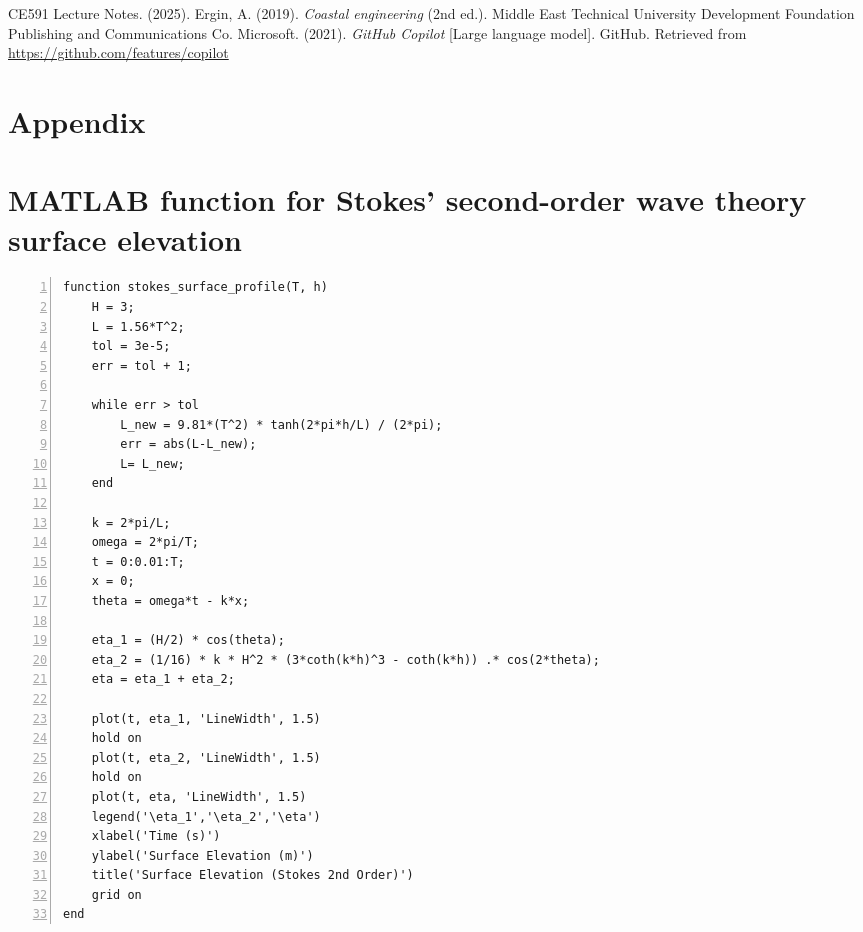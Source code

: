 \documentclass[a4paper]{article}
\begin{document}
\newpage

\begin{thebibliography}{99}
     CE591 Lecture Notes. (2025). 
     Ergin, A. (2019). \textit{Coastal engineering} (2nd ed.). Middle East Technical University Development Foundation Publishing and Communications Co.
     Microsoft. (2021). \textit{GitHub Copilot} [Large language model]. GitHub. Retrieved from \url{https://github.com/features/copilot}
\end{thebibliography}

\newpage
\appendix

\section{Appendix}

\section*{\small MATLAB function for Stokes' second-order wave theory surface elevation}
\begin{lstlisting}[frame=single, numbers=left, style=Matlab-Pyglike]
function stokes_surface_profile(T, h)
    H = 3;
    L = 1.56*T^2; 
    tol = 3e-5;
    err = tol + 1;

    while err > tol
        L_new = 9.81*(T^2) * tanh(2*pi*h/L) / (2*pi);
        err = abs(L-L_new);
        L= L_new;
    end

    k = 2*pi/L;
    omega = 2*pi/T;
    t = 0:0.01:T;
    x = 0;
    theta = omega*t - k*x;

    eta_1 = (H/2) * cos(theta);
    eta_2 = (1/16) * k * H^2 * (3*coth(k*h)^3 - coth(k*h)) .* cos(2*theta);
    eta = eta_1 + eta_2;

    plot(t, eta_1, 'LineWidth', 1.5)
    hold on
    plot(t, eta_2, 'LineWidth', 1.5)
    hold on
    plot(t, eta, 'LineWidth', 1.5)
    legend('\eta_1','\eta_2','\eta')
    xlabel('Time (s)')
    ylabel('Surface Elevation (m)')
    title('Surface Elevation (Stokes 2nd Order)')
    grid on
end
\end{lstlisting}
\newpage
\end{document}
